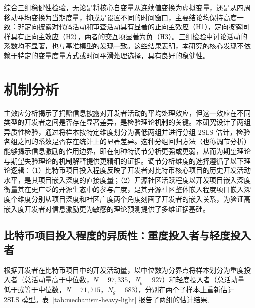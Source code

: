 \documentclass[
    type = master, %
    degree = professional,        %
    decl-page,  %
    twoside,                %
    fontset = fandol %
  ]{njuthesis}
\begin{document}
综合三组稳健性检验，无论是将核心自变量从连续值变换为虚拟变量，还是从四周移动平均变换为当期度量，抑或是设置不同的时间窗口，主要结论均保持高度一致：非定向披露对代码活动和审查活动具有显著的正向主效应（H1），定向披露同样具有正向主效应（H2），两者的交互项显著为负（H3）。三组检验中讨论活动的系数均不显著，也与基准模型的发现一致。这些结果表明，本研究的核心发现不依赖于特定的变量度量方式或时间平滑处理选择，具有良好的稳健性。

\section{机制分析}
\label{sec:mechanism-1}

主效应分析揭示了捐赠信息披露对开发者活动的平均处理效应，但这一效应在不同类型的开发者之间是否存在显著差异，是检验理论机制的关键。本研究设计了两组异质性检验，通过将样本按特定维度划分为高低两组并进行分组 2SLS 估计，检验各组之间的系数是否存在统计上的显著差异。这种分组回归方法（也称调节分析）能够揭示信息激励的作用边界，即在何种特调节分析更强或更弱，从而为期望理论与期望失验理论的机制解释提供更精细的证据。调节分析维度的选择遵循了以下理论逻辑：（1）比特币项目投入程度反映了开发者对比特币核心项目的历史开发活动水平，是其项目嵌入深度的直接度量；（2）开源社区活跃程度以开发项目嵌入深度衡量其在更广泛的开源生态中的参与广度，是其开源社区整体嵌入程度项目嵌入深度个维度分别从项目深度和社区广度两个角度刻画了开发者的嵌入关系，为验证高嵌入度开发者对信息激励更为敏感的理论预测提供了多维证据基础。

\subsection{比特币项目投入程度的异质性：重度投入者与轻度投入者}

根据开发者在比特币项目中的开发活动量，以中位数为分界点将样本划分为重度投入者（总活动量高于中位数，$N = 97{,}335$，$N_g = 927$）和轻度投入者（总活动量低于或等于中位数，$N = 71{,}715$，$N_g = 683$），分别在两个子样本上重新估计 2SLS 模型。表~\ref{tab:mechanism-heavy-light} 报告了两组的估计结果。
\end{document}
